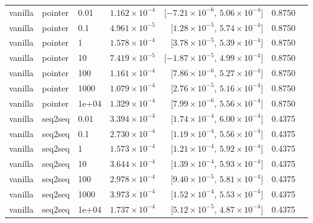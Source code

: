 \documentclass[10pt]{article}
\begin{document}
{\begin{longtable}{lllrrrl}
vanilla & pointer & 0.01 & $1.162\times10^{-4}$ & [$-7.21\times10^{-6}$, $5.06\times10^{-4}$] & 0.8750 & \\
vanilla & pointer & 0.1 & $4.961\times10^{-5}$ & [$1.28\times10^{-5}$, $5.74\times10^{-4}$] & 0.8750 & \\
vanilla & pointer & 1 & $1.578\times10^{-4}$ & [$3.78\times10^{-5}$, $5.39\times10^{-4}$] & 0.8750 & \\
vanilla & pointer & 10 & $7.419\times10^{-5}$ & [$-1.87\times10^{-5}$, $4.99\times10^{-4}$] & 0.8750 & \\
vanilla & pointer & 100 & $1.161\times10^{-4}$ & [$7.86\times10^{-6}$, $5.27\times10^{-4}$] & 0.8750 & \\
vanilla & pointer & 1000 & $1.079\times10^{-4}$ & [$2.76\times10^{-5}$, $5.16\times10^{-4}$] & 0.8750 & \\
vanilla & pointer & 1e+04 & $1.329\times10^{-4}$ & [$7.99\times10^{-6}$, $5.56\times10^{-4}$] & 0.8750 & \\
vanilla & seq2seq & 0.01 & $3.394\times10^{-4}$ & [$1.74\times10^{-4}$, $6.00\times10^{-4}$] & 0.4375 & \\
vanilla & seq2seq & 0.1 & $2.730\times10^{-4}$ & [$1.19\times10^{-4}$, $5.56\times10^{-4}$] & 0.4375 & \\
vanilla & seq2seq & 1 & $1.573\times10^{-4}$ & [$1.21\times10^{-4}$, $5.92\times10^{-4}$] & 0.4375 & \\
vanilla & seq2seq & 10 & $3.644\times10^{-4}$ & [$1.39\times10^{-4}$, $5.93\times10^{-4}$] & 0.4375 & \\
vanilla & seq2seq & 100 & $2.978\times10^{-4}$ & [$9.40\times10^{-5}$, $5.81\times10^{-4}$] & 0.4375 & \\
vanilla & seq2seq & 1000 & $3.973\times10^{-4}$ & [$1.52\times10^{-4}$, $5.53\times10^{-4}$] & 0.4375 & \\
vanilla & seq2seq & 1e+04 & $1.737\times10^{-4}$ & [$5.12\times10^{-5}$, $4.87\times10^{-4}$] & 0.4375 & \\
\bottomrule
\end{longtable}
}
\end{document}
